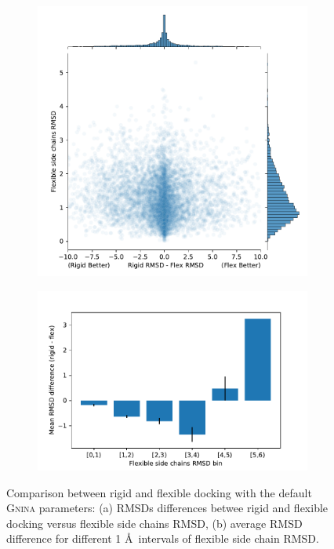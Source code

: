 \documentclass[journal=jcisd8,manuscript=article]{achemso}
\begin{document}
\begin{figure}    
        \begin{subfigure}[b]{0.48\textwidth}    
		\centering
		\includegraphics[width=\textwidth]{figures/crossdocking-flex/rmsd-diff_vs_side-chain-rmsd.pdf}
		\caption{}
		\label{fig:flexRMSDdist}
        \end{subfigure}    
        \begin{subfigure}[b]{0.48\textwidth}    
		\centering
		\includegraphics[width=\textwidth]{figures/crossdocking-flex/mean-diff-rmsd_vs_flex-rmsd-bin_hist.pdf}
		\caption{}
		\label{fig:flexRMSDavg}
        \end{subfigure}    
	\caption{Comparison between rigid and flexible docking with the default \textsc{Gnina} parameters: (a) RMSDs differences betwee rigid and flexible docking versus flexible side chains RMSD, (b) average RMSD difference for different 1 \AA\ intervals of flexible side chain RMSD.}
	\label{fig:flexCD}
\end{figure}
\end{document}
